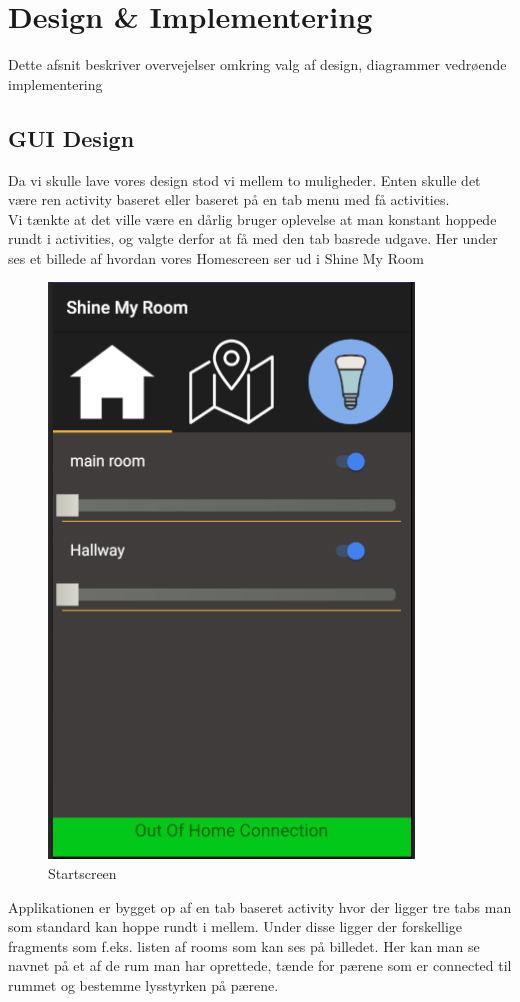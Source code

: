 \chapter{Design \& Implementering}

Dette afsnit beskriver overvejelser omkring valg af design, diagrammer vedrøende implementering

\section{GUI Design}
Da vi skulle lave vores design stod vi mellem to muligheder. Enten skulle det være ren activity baseret eller baseret på en tab menu med få activities. \\
Vi tænkte at det ville være en dårlig bruger oplevelse at man konstant hoppede rundt i activities, og valgte derfor at få med den tab basrede udgave.
Her under ses et billede af hvordan vores Homescreen ser ud i Shine My Room

\begin{figure}[H]
	\centering
	\includegraphics[width=0.5\linewidth, height=0.7\linewidth]{Design/Startscreen}
	\caption{Startscreen}
	\label{fig:Startscreen}
\end{figure}
Applikationen er bygget op af en tab baseret activity hvor der ligger tre tabs man som standard kan hoppe rundt i mellem. Under disse ligger der forskellige fragments som f.eks. listen af rooms som kan ses på billedet. Her kan man se navnet på et af de rum man har oprettede, tænde for pærene som er connected til rummet og bestemme lysstyrken på pærene.


